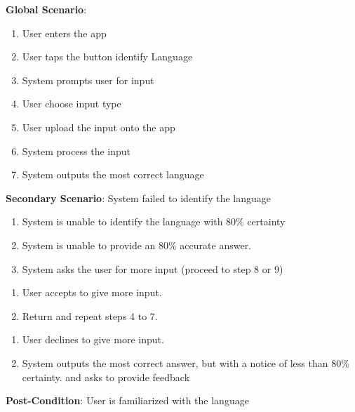 	\textbf{Global Scenario}:
	\begin{enumerate}[{\bf 1.}]
		\item User enters the app
		\item User taps the button identify Language
		\item System prompts user for input
		\item User choose input type
		\item User upload the input onto the app
		\item System process the input
		\item System outputs the most correct language
	\end{enumerate}
	\textbf{Secondary Scenario}: System failed to identify the language
	\begin{enumerate}[{\bf 7.}i.]
		\item  System is unable to identify the language with 80\% certainty
		\item System is unable to provide an 80\% accurate answer.
		\item System asks the user for more input (proceed to step 8 or 9)
	\end{enumerate}
	\begin{enumerate}[{\bf 8.}i.]
		\item User accepts to give more input.
		\item Return and repeat steps 4 to 7.
	\end{enumerate}
	\begin{enumerate}[{\bf 9}i.]
		\item User declines to give more input.
		\item System outputs the most correct answer, but with a notice of less than 80\% certainty. and asks to provide feedback
	\end{enumerate}
	\textbf{Post-Condition}: User is familiarized with the language